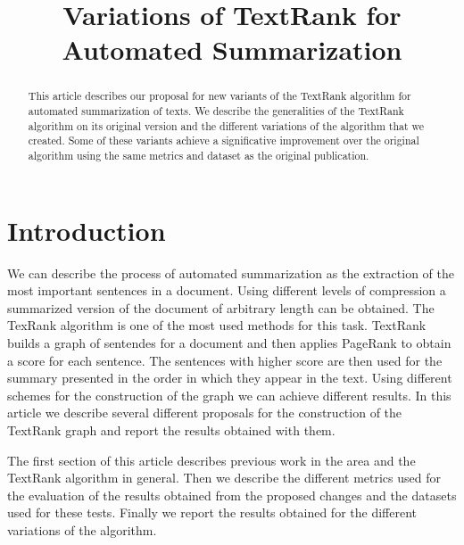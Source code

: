 \documentclass{llncs}
\begin{document}
\frontmatter

\title{Variations of TextRank for Automated Summarization}


\maketitle

\begin{abstract}
This article describes our proposal for new variants of the TextRank algorithm for automated summarization of texts. We describe the generalities of the TextRank algorithm on its original version and the different variations of the algorithm that we created. Some of these variants achieve a significative improvement over the original algorithm using the same metrics and dataset as the original publication. 

\end{abstract}

\section{Introduction}
We can describe the process of automated summarization as the extraction of the most important sentences in a document. Using different levels of compression a summarized version of the document of arbitrary length can be obtained. The TexRank algorithm is one of the most used methods for this task. TextRank builds a graph of sentendes for a document and then applies PageRank to obtain a score for each sentence. The sentences with higher score are then used for the summary presented in the order in which they appear in the text. Using different schemes for the construction of the graph we can achieve different results. In this article we describe several different proposals for the construction of the TextRank graph and report the results obtained with them.

The first section of this article describes previous work in the area and the TextRank algorithm in general. Then we describe the different metrics used for the evaluation of the results obtained from the proposed changes and the datasets used for these tests. Finally we report the results obtained for the different variations of the algorithm.
\end{document}
